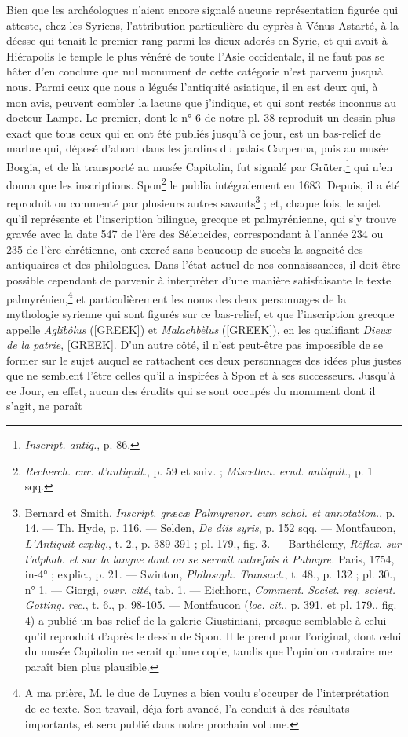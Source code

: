 \documentclass[a4paper, 11pt, oneside, polutonikogreek, french]{article}
\begin{document}
Bien que les archéologues n'aient encore signalé aucune représentation figurée qui atteste, chez les Syriens, l'attribution particulière du cyprès à Vénus-Astarté, à la déesse qui tenait le premier rang parmi les dieux adorés en Syrie, et qui avait à Hiérapolis le temple le plus vénéré de toute l'Asie occidentale, il ne faut pas se hâter d'en conclure que nul monument de cette catégorie n'est parvenu jusquà nous. Parmi ceux que nous a légués l'antiquité asiatique, il en est deux qui, à mon avis, peuvent combler la lacune que j'indique, et qui sont restés inconnus au docteur Lampe. Le premier, dont le n° 6 de notre pl. 38 reproduit un dessin plus exact que tous ceux qui en ont été publiés jusqu'à ce jour, est un bas-relief de marbre qui, déposé d'abord dans les jardins du palais Carpenna, puis au musée Borgia, et de là transporté au musée Capitolin, fut signalé par Grüter,\footnote{\emph{Inscript. antiq.}, p. 86.} qui n'en donna que les inscriptions. Spon\footnote{\emph{Recherch. cur. d'antiquit.}, p. 59 et suiv. ; \emph{Miscellan. erud. antiquit.}, p. 1 sqq.} le publia intégralement en 1683. Depuis, il a été reproduit ou commenté par plusieurs autres savants\footnote{Bernard et Smith, \emph{Inscript. græcæ Palmyrenor. cum schol. et annotation.}, p. 14. --- Th. Hyde, p. 116. --- Selden, \emph{De diis syris}, p. 152 sqq. --- Montfaucon, \emph{L'Antiquit expliq.}, t. 2., p. 389-391 ; pl. 179., fig. 3. --- Barthélemy, \emph{Réflex. sur l'alphab. et sur la langue dont on se servait autrefois à Palmyre.} Paris, 1754, in-4° ; explic., p. 21. --- Swinton, \emph{Philosoph. Transact.}, t. 48., p. 132 ; pl. 30., n° 1. --- Giorgi, \emph{ouvr. cité}, tab. 1. --- Eichhorn, \emph{Comment. Societ. reg. scient. Gotting. rec.}, t. 6., p. 98-105. --- Montfaucon (\emph{loc. cit.}, p. 391, et pl. 179., fig. 4) a publié un bas-relief de la galerie Giustiniani, presque semblable à celui qu'il reproduit d'après le dessin de Spon. Il le prend pour l'original, dont celui du musée Capitolin ne serait qu'une copie, tandis que l'opinion contraire me paraît bien plus plausible.} ; et, chaque fois, le sujet qu'il représente et l'inscription bilingue, grecque et palmyrénienne, qui s'y trouve gravée avec la date 547 de l'ère des Séleucides, correspondant à l'année 234 ou 235 de l'ère chrétienne, ont exercé sans beaucoup de succès la sagacité des antiquaires et des philologues. Dans l'état actuel de nos connaissances, il doit être possible cependant de parvenir à interpréter d'une manière satisfaisante le texte palmyrénien,\footnote{A ma prière, M. le duc de Luynes a bien voulu s'occuper de l'interprétation de ce texte. Son travail, déja fort avancé, l'a conduit à des résultats importants, et sera publié dans notre prochain volume.} et particulièrement les noms des deux personnages de la mythologie syrienne qui sont figurés sur ce bas-relief, et que l'inscription grecque appelle \emph{Aglibôlus} ([GREEK]) et \emph{Malachbèlus} ([GREEK]), en les qualifiant \emph{Dieux de la patrie}, [GREEK]. D'un autre côté, il n'est peut-être pas impossible de se former sur le sujet auquel se rattachent ces deux personnages des idées plus justes que ne semblent l'être celles qu'il a inspirées à Spon et à ses successeurs. Jusqu'à ce Jour, en effet, aucun des érudits qui se sont occupés du monument dont il s'agit, ne paraît 
\end{document}

